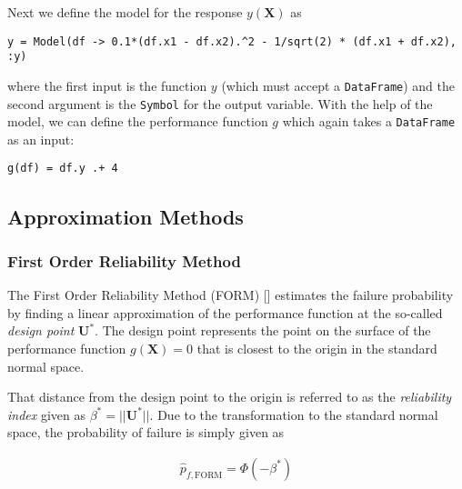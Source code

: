 Next we define the model for the response \(y(\boldsymbol{X})\) as




\begin{verbatim}
y = Model(df -> 0.1*(df.x1 - df.x2).^2 - 1/sqrt(2) * (df.x1 + df.x2), :y)
\end{verbatim}



where the first input is the function \(y\) (which must accept a \texttt{DataFrame}) and the second argument is the \texttt{Symbol} for the output variable. With the help of the model, we can define the performance function \(g\) which again takes a \texttt{DataFrame} as an input:




\begin{verbatim}
g(df) = df.y .+ 4
\end{verbatim}



\subsection{Approximation Methods}



\label{13997252733228183761}{}


\subsubsection{First Order Reliability Method}



\label{9085550815434865802}{}


The First Order Reliability Method (FORM) [] estimates the failure probability by finding a linear approximation of the performance function at the so-called \emph{design point} \(\boldsymbol{U}^*\). The design point represents the point on the surface of the performance function \(g(\boldsymbol{X}) = 0\) that is closest to the origin in the standard normal space.



That distance from the design point to the origin is referred to as the \emph{reliability index} given as \(\beta^* = ||\boldsymbol{U}^*||\). Due to the transformation to the standard normal space, the probability of failure is simply given as



\begin{equation*}
\begin{split}\hat{p}_{f, \mathrm{FORM}} = \Phi(-\beta^*)\end{split}\end{equation*}


